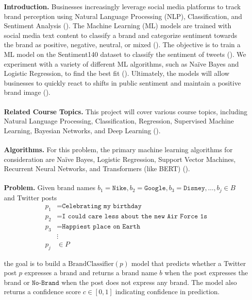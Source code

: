 \documentclass{article}
\begin{document}

\textbf{Introduction.} Businesses increasingly leverage social media platforms to track brand perception using Natural Language Processing (NLP), Classification, and Sentiment Analysis (\cite{alessia2015approaches, benedetto2016big}). The Machine Learning (ML) models are trained with social media text content to classify a brand and categorize sentiment towards the brand as positive, negative, neutral, or mixed (\cite{anupama2020real, go2009twitter}). The objective is to train a ML model on the Sentiment140 dataset to classify the sentiment of tweets (\cite{pak2010twitter}). We experiment with a variety of different ML algorithms, such as Naïve Bayes and Logistic Regression, to find the best fit (\cite{howard2018universal}). Ultimately, the models will allow businesses to quickly react to shifts in public sentiment and maintain a positive brand image (\cite{vidya2015twitter, petasis2013large}). \\
\\
\textbf{Related Course Topics.} This project will cover various course topics, including Natural Language Processing, Classification, Regression, Supervised Machine Learning, Bayesian Networks, and Deep Learning (\cite{liu2020aspect, socher2013recursive}).\\
\\
\textbf{Algorithms.} For this problem, the primary machine learning algorithms for consideration are Naïve Bayes, Logistic Regression, Support Vector Machines, Recurrent Neural Networks, and Transformers (like BERT) (\cite{severyn2015twitter}).\\
\\
\textbf{Problem.} Given brand names $b_1 = \texttt{Nike}, b_2 = \texttt{Google}, b_3 = \texttt{Disney}, \dots, b_j \in B$ and Twitter posts
\begin{align*}
    p_1 & = \texttt{Celebrating my birthday}                      \\
    p_2 & = \texttt{I could care less about the new Air Force 1s} \\
    p_3 & = \texttt{Happiest place on Earth}                      \\
        & \vdots                                                  \\
    p_j & \in P
\end{align*}

the goal is to build a $\mathrm{BrandClassifier}(p)$ model that predicts whether a Twitter post $p$ expresses a brand and returns a brand name $b$ when the post expresses the brand or $\texttt{No-Brand}$ when the post does not express any brand. The model also returns a confidence score $c \in [0, 1]$ indicating confidence in prediction.
\end{document}
